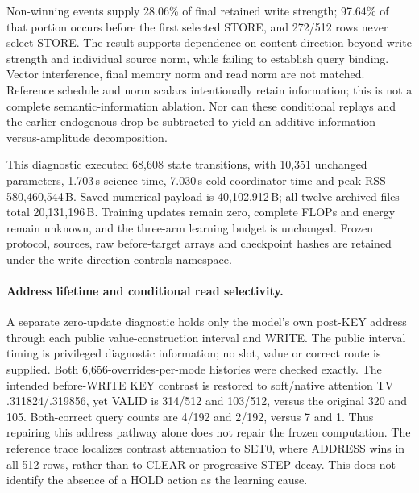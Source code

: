Non-winning events supply 28.06\% of final retained write strength;
97.64\% of that portion occurs before the first selected STORE, and
272/512 rows never select STORE. The result supports dependence on content
direction beyond write strength and individual source norm, while failing
to establish query binding. Vector interference, final memory norm and read
norm are not matched. Reference schedule and norm scalars intentionally
retain information; this is not a complete semantic-information ablation.
Nor can these conditional replays and the earlier endogenous drop be
subtracted to yield an additive information-versus-amplitude decomposition.

This diagnostic executed 68,608 state transitions, with 10,351 unchanged
parameters, 1.703\,s science time, 7.030\,s cold coordinator time and peak
RSS 580,460,544\,B. Saved numerical payload is 40,102,912\,B; all twelve
archived files total 20,131,196\,B. Training updates remain zero, complete
FLOPs and energy remain unknown, and the three-arm learning budget is
unchanged. Frozen protocol, sources, raw before-target arrays and checkpoint
hashes are retained under the write-direction-controls namespace.


\paragraph{Address lifetime and conditional read selectivity.}
A separate zero-update diagnostic holds only the model's own post-KEY address
through each public value-construction interval and WRITE. The public interval
timing is privileged diagnostic information; no slot, value or correct route is
supplied. Both 6,656-overrides-per-mode histories were checked exactly. The
intended before-WRITE KEY contrast is restored to soft/native attention TV
.311824/.319856, yet VALID is 314/512 and 103/512, versus the original 320
and 105. Both-correct query counts are 4/192 and 2/192, versus 7 and 1.
Thus repairing this address pathway alone does not repair the frozen computation.
The reference trace localizes contrast attenuation to SET0, where ADDRESS wins
in all 512 rows, rather than to CLEAR or progressive STEP decay. This does not
identify the absence of a HOLD action as the learning cause.

